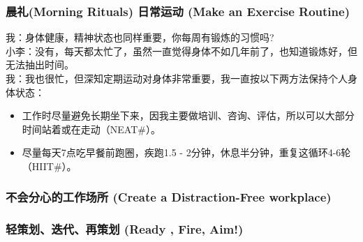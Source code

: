 \hypertarget{ux6839ux56e0ux5206ux6790ux8befux89e3ux6848ux4f8b}{%
\subsubsection{晨礼(Morning Rituals) 日常运动 (Make an Exercise Routine)}\label{ux6839ux56e0ux5206ux6790ux8befux89e3ux6848ux4f8b}}



我：身体健康，精神状态也同样重要，你每周有锻炼的习惯吗?\\
小李：没有，每天都太忙了，虽然一直觉得身体不如几年前了，也知道锻炼好，但无法抽出时间。\\
我：我也很忙，但深知定期运动对身体非常重要，我一直按以下两方法保持个人身体状态：

\begin{itemize}
\tightlist
\item
  工作时尽量避免长期坐下来，因我主要做培训、咨询、评估，所以可以大部分时间站着或在走动（NEAT\#）。
\item
  尽量每天7点吃早餐前跑圈，疾跑1.5 -
  2分钟，休息半分钟，重复这循环4-6轮（HIIT\#）。
\end{itemize}

\hypertarget{ux6839ux56e0ux5206ux6790ux8befux89e3ux6848ux4f8b}{%
\subsubsection{不会分心的工作场所 (Create a Distraction-Free workplace)}\label{ux6839ux56e0ux5206ux6790ux8befux89e3ux6848ux4f8b}}

\hypertarget{ux6839ux56e0ux5206ux6790ux8befux89e3ux6848ux4f8b}{%
\subsubsection{轻策划、迭代、再策划 (Ready , Fire, Aim!)}\label{ux6839ux56e0ux5206ux6790ux8befux89e3ux6848ux4f8b}}

